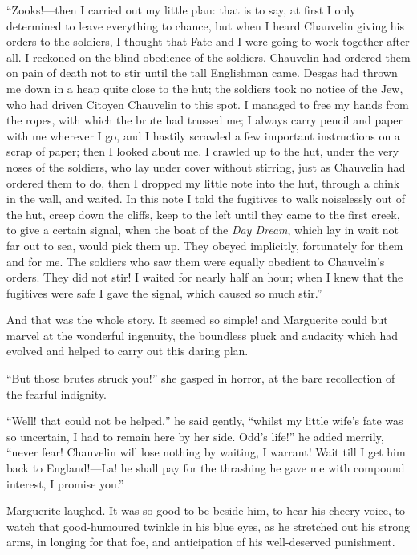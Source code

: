 \documentclass[paper=a5,BCOR=7mm,twoside,DIV=calc,12pt,usegeometry,chapterprefix,endperiod,headings=big]{scrbook}
\begin{document}
\enquote{Zooks!---then I carried out my little plan: that is to say, at first I only determined to leave everything to chance, but when I heard Chauvelin giving his orders to the soldiers, I thought that Fate and I were going to work together after all. I reckoned on the blind obedience of the soldiers. Chauvelin had ordered them on pain of death not to stir until the tall Englishman came. Desgas had thrown me down in a heap quite close to the hut; the soldiers took no notice of the Jew, who had driven Citoyen Chauvelin to this spot. I managed to free my hands from the ropes, with which the brute had trussed me; I always carry pencil and paper with me wherever I go, and I hastily scrawled a few important instructions on a scrap of paper; then I looked about me. I crawled up to the hut, under the very noses of the soldiers, who lay under cover without stirring, just as Chauvelin had ordered them to do, then I dropped my little note into the hut, through a chink in the wall, and waited. In this note I told the fugitives to walk noiselessly out of the hut, creep down the cliffs, keep to the left until they came to the first creek, to give a certain signal, when the boat of the \textit{Day Dream}, which lay in wait not far out to sea, would pick them up. They obeyed implicitly, fortunately for them and for me. The soldiers who saw them were equally obedient to Chauvelin's orders. They did not stir! I waited for nearly half an hour; when I knew that the fugitives were safe I gave the signal, which caused so much stir.}

And that was the whole story. It seemed so simple! and Marguerite could but marvel at the wonderful ingenuity, the boundless pluck and audacity which had evolved and helped to carry out this daring plan.

\enquote{But those brutes struck you!} she gasped in horror, at the bare recollection of the fearful indignity.

\enquote{Well! that could not be helped,} he said gently, \enquote{whilst my little wife's fate was so uncertain, I had to remain here by her side. Odd's life!} he added merrily, \enquote{never fear! Chauvelin will lose nothing by waiting, I warrant! Wait till I get him back to England!---La! he shall pay for the thrashing he gave me with compound interest, I promise you.}

Marguerite laughed. It was so good to be beside him, to hear his cheery voice, to watch that good-humoured twinkle in his blue eyes, as he stretched out his strong arms, in longing for that foe, and anticipation of his well-deserved punishment.
\end{document}
